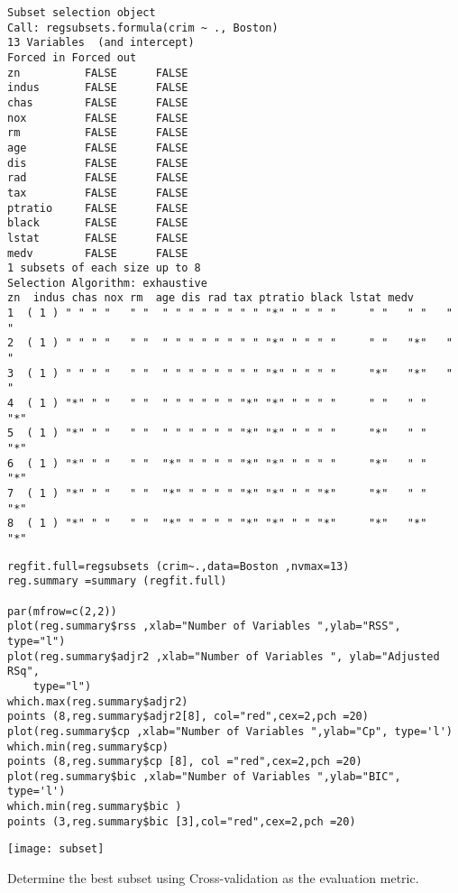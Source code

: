 \documentclass[a4paper,man,natbib]{apa6}
\begin{document}
\begin{verbatim}
Subset selection object
Call: regsubsets.formula(crim ~ ., Boston)
13 Variables  (and intercept)
Forced in Forced out
zn          FALSE      FALSE
indus       FALSE      FALSE
chas        FALSE      FALSE
nox         FALSE      FALSE
rm          FALSE      FALSE
age         FALSE      FALSE
dis         FALSE      FALSE
rad         FALSE      FALSE
tax         FALSE      FALSE
ptratio     FALSE      FALSE
black       FALSE      FALSE
lstat       FALSE      FALSE
medv        FALSE      FALSE
1 subsets of each size up to 8
Selection Algorithm: exhaustive
zn  indus chas nox rm  age dis rad tax ptratio black lstat medv
1  ( 1 ) " " " "   " "  " " " " " " " " "*" " " " "     " "   " "   " " 
2  ( 1 ) " " " "   " "  " " " " " " " " "*" " " " "     " "   "*"   " " 
3  ( 1 ) " " " "   " "  " " " " " " " " "*" " " " "     "*"   "*"   " " 
4  ( 1 ) "*" " "   " "  " " " " " " "*" "*" " " " "     " "   " "   "*" 
5  ( 1 ) "*" " "   " "  " " " " " " "*" "*" " " " "     "*"   " "   "*" 
6  ( 1 ) "*" " "   " "  "*" " " " " "*" "*" " " " "     "*"   " "   "*" 
7  ( 1 ) "*" " "   " "  "*" " " " " "*" "*" " " "*"     "*"   " "   "*" 
8  ( 1 ) "*" " "   " "  "*" " " " " "*" "*" " " "*"     "*"   "*"   "*" 
\end{verbatim}

\begin{verbatim}
regfit.full=regsubsets (crim~.,data=Boston ,nvmax=13)
reg.summary =summary (regfit.full)

par(mfrow=c(2,2))
plot(reg.summary$rss ,xlab="Number of Variables ",ylab="RSS", type="l")
plot(reg.summary$adjr2 ,xlab="Number of Variables ", ylab="Adjusted RSq",
	type="l")
which.max(reg.summary$adjr2)
points (8,reg.summary$adjr2[8], col="red",cex=2,pch =20)
plot(reg.summary$cp ,xlab="Number of Variables ",ylab="Cp", type='l')
which.min(reg.summary$cp)
points (8,reg.summary$cp [8], col ="red",cex=2,pch =20)
plot(reg.summary$bic ,xlab="Number of Variables ",ylab="BIC", type='l')
which.min(reg.summary$bic )
points (3,reg.summary$bic [3],col="red",cex=2,pch =20)
\end{verbatim}

\texttt{[image: subset]}

Determine the best subset using Cross-validation as the evaluation metric. \\
\end{document}
